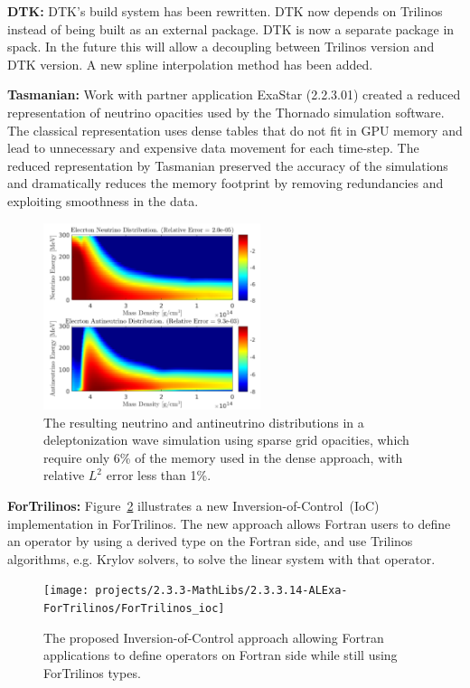 {\bf DTK:} DTK's build system has been rewritten. DTK now depends on Trilinos
instead of being built as an external package. DTK is now a separate package in
spack. In the future this will allow a decoupling between Trilinos version and
DTK version. A new spline interpolation method has been added.

{\bf Tasmanian:} Work with partner application ExaStar (2.2.3.01) created a
reduced representation of neutrino opacities used by the Thornado simulation
software. The classical representation uses dense tables that do not fit in
GPU memory and lead to unnecessary and expensive data movement for each time-step.
The reduced representation by Tasmanian preserved the accuracy of the simulations
and dramatically reduces the memory footprint by removing redundancies
and exploiting smoothness in the data.

\begin{figure}[htb]
        \centering
        \includegraphics[width=2.5in]{projects/2.3.3-MathLibs/2.3.3.14-ALExa-ForTrilinos/tasmanian_exastar}
\caption{\label{fig:tasmanian-exastar}
		The resulting neutrino and antineutrino distributions in a deleptonization
		wave simulation using sparse grid opacities, which require only 6\% of
		the memory used in the dense approach, with relative $L^2$ error less than 1\%.}
\end{figure}

{\bf ForTrilinos:}
Figure~\ref{fig:fortran_ioc} illustrates a new Inversion-of-Control~(IoC)
implementation in ForTrilinos. The new approach allows Fortran users to define
an operator by using a derived type on the Fortran side, and use Trilinos
algorithms, e.g. Krylov solvers, to solve the linear system with that operator.

\begin{figure}[htb]
    \centering
    \texttt{[image: projects/2.3.3-MathLibs/2.3.3.14-ALExa-ForTrilinos/ForTrilinos\_ioc]}
    \caption{\label{fig:fortran_ioc}The proposed Inversion-of-Control approach
    allowing Fortran applications to define operators on Fortran side while
    still using ForTrilinos types.}
\end{figure}

